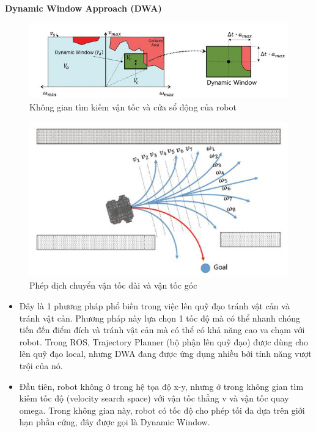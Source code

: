 \textbf{Dynamic Window Approach (DWA)}\\
\begin{figure}[tph]
	\centering
	\includegraphics[width=0.8\linewidth]{chapter2/figs/dwa}
	\caption{Không gian tìm kiếm vận tốc và cửa sổ động của robot}
	\label{fig:dwa}
\end{figure}
\begin{figure}[tph]
	\centering
	\includegraphics[width=0.7\linewidth]{chapter2/figs/dwa1}
	\caption{Phép dịch chuyển vận tốc dài và vận tốc góc}
	\label{fig:dwa1}
\end{figure}

\begin{itemize}
	\item Đây là  1 phương pháp phổ biến trong việc lên quỹ đạo tránh vật cản và tránh vật cản. Phương pháp này lựa chọn 1 tốc độ mà có thể nhanh chóng tiến đến điểm đích và tránh vật cản mà có thể có khả năng cao va chạm với robot. Trong ROS, Trajectory Planner (bộ phận lên quỹ đạo) được dùng cho lên quỹ đạo local, nhưng DWA đang được ứng dụng nhiều bởi tính năng vượt trội của nó. 
	\item Đầu tiên, robot không ở trong hệ tọa độ x-y, nhưng ở trong không gian tìm kiếm tốc độ (velocity search space) với vận tốc thẳng v và vận tốc quay omega. Trong không gian này, robot có tốc độ cho phép tối đa dựa trên giới hạn phần cứng, đây được gọi là Dynamic Window.
\end{itemize}

